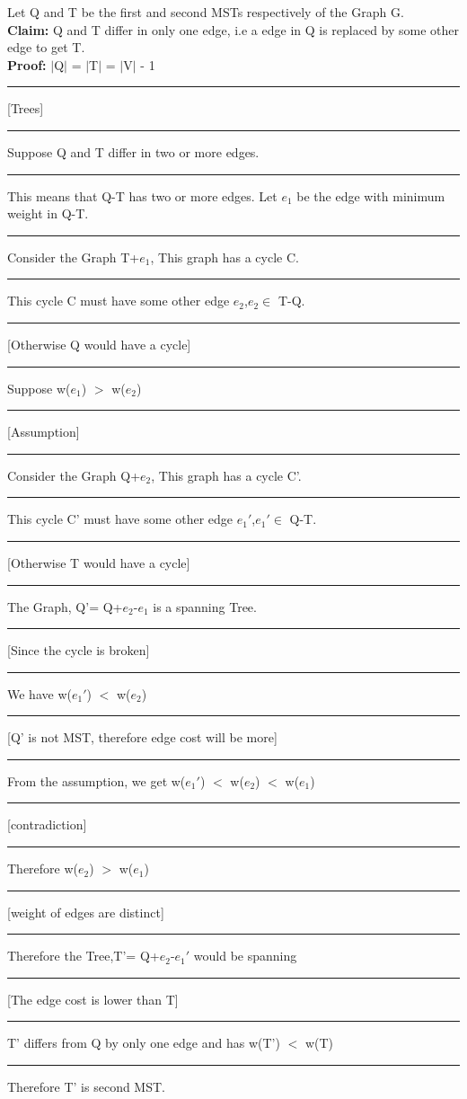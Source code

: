 \documentclass{report}
\begin{document}
 Let Q and T be the first and second MSTs respectively of the Graph G.\\
 \textbf{Claim:} Q and T differ in only one edge, i.e a edge in Q is replaced by some other edge to get T.\\
 \textbf{Proof:} $|$Q$|$ = $|$T$|$ = $|$V$|$ - 1 \noindent\rule[0.5mm]{6cm}{0pt} [Trees]\\
 \noindent\rule[0.5mm]{1cm}{0pt} Suppose Q and T differ in two or more edges.\\
 \noindent\rule[0.5mm]{1cm}{0pt} This means that Q-T has two or more edges. Let $e_1$ be the edge with minimum weight in Q-T.\\
 \noindent\rule[0.5mm]{1cm}{0pt} Consider the Graph T+$e_1$, This graph has a cycle C.\\
 \noindent\rule[0.5mm]{1cm}{0pt} This cycle C must have some other edge $e_2$,$e_2 \in$ T-Q.\noindent\rule[0.5mm]{1cm}{0pt} [Otherwise Q would have a cycle]\\
 \noindent\rule[0.5mm]{1cm}{0pt} Suppose w($e_1$) $>$ w($e_2$)\noindent\rule[0.5mm]{5.46cm}{0pt} [Assumption]\\
 \noindent\rule[0.5mm]{1cm}{0pt} Consider the Graph Q+$e_2$, This graph has a cycle C'.\\
 \noindent\rule[0.5mm]{1cm}{0pt} This cycle C' must have some other edge $e_1'$,$e_1' \in$ Q-T.\noindent\rule[0.5mm]{0.9cm}{0pt} [Otherwise T would have a cycle]\\
 \noindent\rule[0.5mm]{1cm}{0pt} The Graph, Q'= Q+$e_2$-$e_1$ is a spanning Tree. \noindent\rule[0.5mm]{2.1cm}{0pt} [Since the cycle is broken]\\
 \noindent\rule[0.5mm]{1cm}{0pt} We have w($e_1'$) $<$ w($e_2$) \noindent\rule[0.5mm]{4cm}{0pt} [Q' is not MST, therefore edge cost will be more]\\
 \noindent\rule[0.5mm]{1cm}{0pt} From the assumption, we get w($e_1'$) $<$ w($e_2$) $<$ w($e_1$) \noindent\rule[0.5mm]{0.95cm}{0pt} [contradiction]\\
 \noindent\rule[0.5mm]{1cm}{0pt} Therefore w($e_2$) $>$ w($e_1$) \noindent\rule[0.5mm]{5.2cm}{0pt} [weight of edges are distinct]\\
 \noindent\rule[0.5mm]{1cm}{0pt} Therefore the Tree,T'= Q+$e_2$-$e_1'$ would be spanning \noindent\rule[0.5mm]{1.2cm}{0pt} [The edge cost is lower than T]\\
 \noindent\rule[0.5mm]{1cm}{0pt} T' differs from Q by only one edge and has w(T') $<$ w(T) \\
 \noindent\rule[0.5mm]{1cm}{0pt} Therefore T' is second MST.\\
\end{document}
